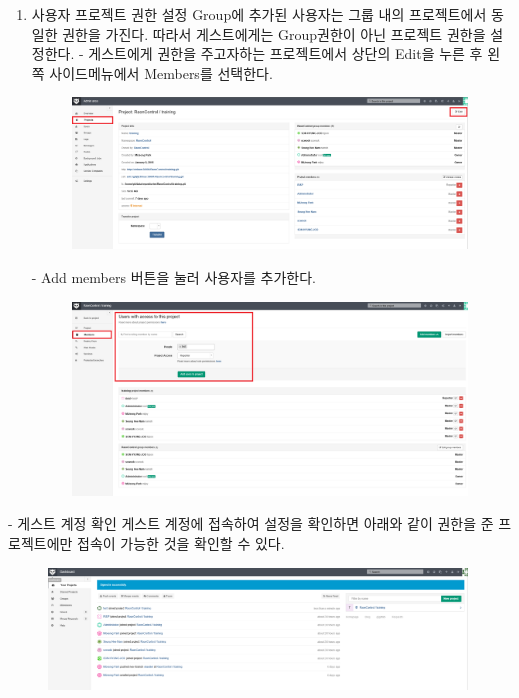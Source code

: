 \documentclass[11pt
  , a4paper
  , article
  , oneside
]{memoir}
\begin{document}
\begin{enumerate}
\item{사용자 프로젝트 권한 설정}
Group에 추가된 사용자는 그룹 내의 프로젝트에서 동일한 권한을 가진다. 따라서 게스트에게는 Group권한이 아닌 프로젝트 권한을 설정한다. 
- 게스트에게 권한을 주고자하는 프로젝트에서 상단의 Edit을 누른 후 왼쪽 사이드메뉴에서 Members를 선택한다.

\begin{figure}[h!]
	\centering
	\includegraphics[width=0.99\textwidth]{./images/22.PNG}
\end{figure}

\clearpage

- Add members 버튼을 눌러 사용자를 추가한다.
\begin{figure}[h!]
	\centering
	\includegraphics[width=0.99\textwidth]{./images/24.PNG}
\end{figure}

\end{enumerate}

- 게스트 계정 확인
게스트 계정에 접속하여 설정을 확인하면 아래와 같이 권한을 준 프로젝트에만 접속이 가능한 것을 확인할 수 있다.
\begin{figure}[h!]
	\centering
	\includegraphics[width=0.99\textwidth]{./images/25.PNG}
\end{figure}
\end{document}

